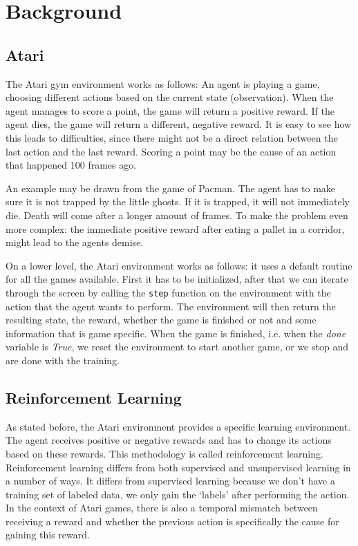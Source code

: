 \documentclass{article}
\begin{document}
\section{Background}

\subsection{Atari}

The Atari gym environment works as follows: An agent is playing a game, choosing different actions based on the current state (observation). When the agent manages to score a point, the game will return a positive reward. If the agent dies, the game will return a different, negative reward. It is easy to see how this leads to difficulties, since there might not be a direct relation between the last action and the last reward. Scoring a point may be the cause of an action that happened 100 frames ago.

An example may be drawn from the game of Pacman. The agent has to make sure it is not trapped by the little ghosts. If it is trapped, it will not immediately die. Death will come after a longer amount of frames. To make the problem even more complex: the immediate positive reward after eating a pallet in a corridor, might lead to the agents demise.

On a lower level, the Atari environment works as follows: it uses a default routine for all the games available. First it has to be initialized, after that we can iterate through the screen by calling the \texttt{step} function on the environment with the action that the agent wants to perform. The environment will then return the resulting state, the reward, whether the game is finished or not and some information that is game specific. When the game is finished, i.e. when the \textit{done} variable is \textit{True}, we reset the environment to start another game, or we stop and are done with the training.

\subsection{Reinforcement Learning}

As stated before, the Atari environment provides a specific learning environment. The agent receives positive or negative rewards and has to change its actions based on these rewards. This methodology is called reinforcement learning. Reinforcement learning differs from both supervised and unsupervised learning in a number of ways. It differs from supervised learning because we don't have a training set of labeled data, we only gain the `labels' after performing the action. In the context of Atari games, there is also a temporal mismatch between receiving a reward and whether the previous action is specifically the cause for gaining this reward.
\end{document}
